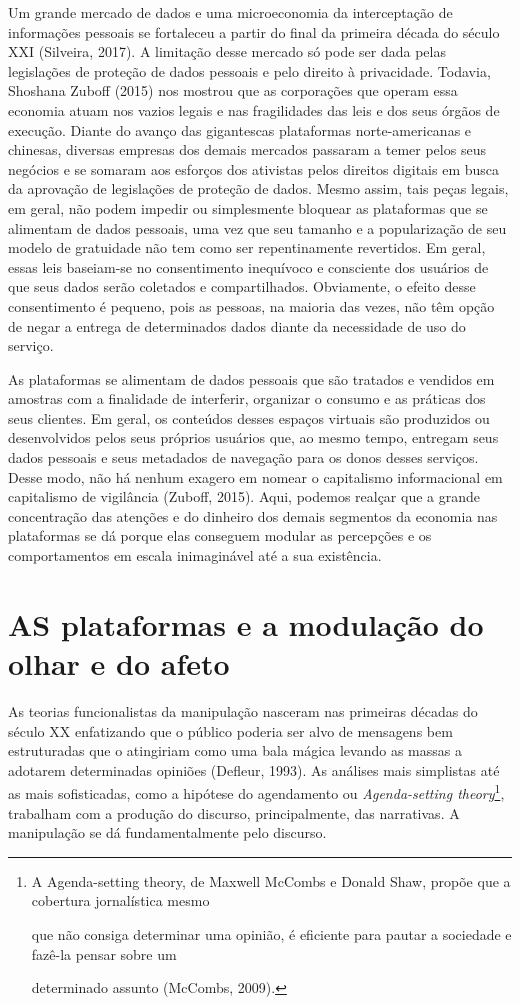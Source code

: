 Um grande mercado de dados e uma microeconomia da interceptação de
informações pessoais se fortaleceu a partir do final da primeira década
do século XXI (Silveira, 2017). A limitação desse mercado só pode ser
dada pelas legislações de proteção de dados pessoais e pelo direito à
privacidade. Todavia, Shoshana Zuboff (2015) nos mostrou que as
corporações que operam essa economia atuam nos vazios legais e nas
fragilidades das leis e dos seus órgãos de execução. Diante do avanço
das gigantescas plataformas norte-americanas e chinesas, diversas
empresas dos demais mercados passaram a temer pelos seus negócios e se
somaram aos esforços dos ativistas pelos direitos digitais em busca da
aprovação de legislações de proteção de dados. Mesmo assim, tais peças
legais, em geral, não podem impedir ou simplesmente bloquear as
plataformas que se alimentam de dados pessoais, uma vez que seu tamanho
e a popularização de seu modelo de gratuidade não tem como ser
repentinamente revertidos. Em geral, essas leis baseiam-se no
consentimento inequívoco e consciente dos usuários de que seus dados
serão coletados e compartilhados. Obviamente, o efeito desse
consentimento é pequeno, pois as pessoas, na maioria das vezes, não têm
opção de negar a entrega de determinados dados diante da necessidade de
uso do serviço.

As plataformas se alimentam de dados pessoais que são tratados e
vendidos em amostras com a finalidade de interferir, organizar o consumo
e as práticas dos seus clientes. Em geral, os conteúdos desses espaços
virtuais são produzidos ou desenvolvidos pelos seus próprios usuários
que, ao mesmo tempo, entregam seus dados pessoais e seus metadados de
navegação para os donos desses serviços. Desse modo, não há nenhum
exagero em nomear o capitalismo informacional em capitalismo de
vigilância (Zuboff, 2015). Aqui, podemos realçar que a grande
concentração das atenções e do dinheiro dos demais segmentos da economia
nas plataformas se dá porque elas conseguem modular as percepções e os
comportamentos em escala inimaginável até a sua existência.

\section{AS plataformas e a modulação do olhar e do afeto}

As teorias funcionalistas da manipulação nasceram nas primeiras décadas
do século XX enfatizando que o público poderia ser alvo de mensagens bem
estruturadas que o atingiriam como uma bala mágica levando as massas a
adotarem determinadas opiniões (Defleur, 1993). As análises mais
simplistas até as mais sofisticadas, como a hipótese do agendamento ou
\emph{Agenda-setting theory}\footnote{A Agenda-setting theory, de
  Maxwell McCombs e Donald Shaw, propõe que a cobertura jornalística
  mesmo

  que não consiga determinar uma opinião, é eficiente para pautar a
  sociedade e fazê-la pensar sobre um

  determinado assunto (McCombs, 2009).}, trabalham com a produção do
discurso, principalmente, das narrativas. A manipulação se dá
fundamentalmente pelo discurso.

